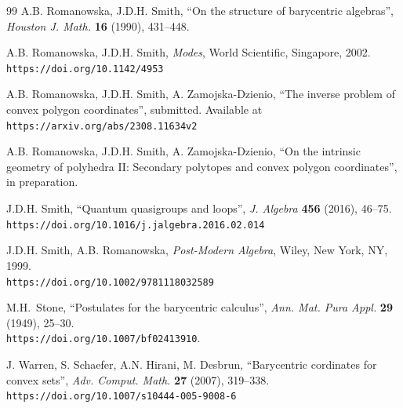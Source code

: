 \documentclass[12pt]{amsart}
\theoremstyle{plain}
\theoremstyle{definition}
\numberwithin{equation}{section}
\begin{document}
\begin{thebibliography}{99}
A.B. Romanowska, J.D.H. Smith,
``{On the structure of barycentric algebras}'',
{\em Houston J. Math.} {\bf 16} (1990), 431--448.

A.B. Romanowska, J.D.H. Smith,
\textit{Modes},
World Scientific, Singapore, 2002.\\
\texttt{https://doi.org/10.1142/4953}

A.B. Romanowska, J.D.H. Smith, A. Zamojska-Dzienio,
``{The inverse problem of convex polygon coordinates}'',
submitted. Available at \texttt{https://arxiv.org/abs/2308.11634v2}

A.B. Romanowska, J.D.H. Smith, A. Zamojska-Dzienio,
``{On the intrinsic geometry of polyhedra II: Secondary polytopes and convex polygon coordinates}'',
in preparation.

J.D.H. Smith,
``{Quantum quasigroups and loops}'',
\textit{J. Algebra} \textbf{456} (2016), 46--75.\\
\texttt{https://doi.org/10.1016/j.jalgebra.2016.02.014}

J.D.H. Smith, A.B. Romanowska,
\textit{Post-Modern Algebra},
Wiley, New York, NY, 1999.\\
\texttt{https://doi.org/10.1002/9781118032589}

 M.H.~Stone, ``{Postulates for the barycentric calculus}'', \textit{Ann. Mat. Pura Appl.} \textbf{29} (1949), 25--30.\\
 \texttt{https://doi.org/10.1007/bf02413910}.

J. Warren, S. Schaefer, A.N. Hirani, M. Desbrun,
``{Barycentric cordinates for convex sets}'',
\textit{Adv. Comput. Math.} \textbf{27} (2007), 319--338.\\
\texttt{https://doi.org/10.1007/s10444-005-9008-6}

\end{thebibliography}
\end{document}
